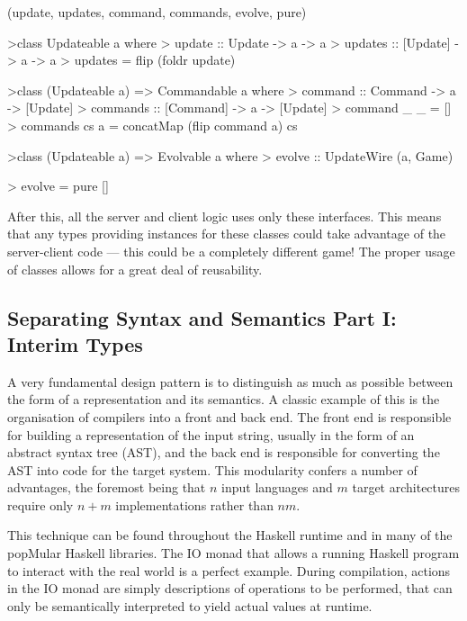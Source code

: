 \functions(update, updates, command, commands, evolve, pure)
\begin{haskell}

>class Updateable a where
>  update  ::  Update  -> a -> a
>  updates :: [Update] -> a -> a
>  updates = flip (foldr update)

>class (Updateable a) => Commandable a where
>  command  ::  Command  -> a -> [Update] 
>  commands :: [Command] -> a -> [Update]
>  command _ _ = []
>  commands cs a = concatMap (flip command a) cs

>class (Updateable a) => Evolvable a where
>  evolve :: UpdateWire (a, Game)

\vspace{-1.7em}
>  evolve = pure []

\end{haskell}
\noindent After this, all the server and client logic uses only these interfaces. This means that any types providing instances for these classes could take advantage of the server-client code --- this could be a completely different game! The proper usage of classes allows for a great deal of reusability. 

\subsection{Separating Syntax and Semantics Part I: Interim Types}

A very fundamental design pattern is to distinguish as much as possible between the form of a representation and its semantics. A classic example of this is the organisation of compilers into a front and back end. The front end is responsible for building a representation of the input string, usually in the form of an abstract syntax tree (AST), and the back end is responsible for converting the AST into code for the target system. This modularity confers a number of advantages, the foremost being that $n$ input languages and $m$ target architectures require only $n+m$ implementations rather than $nm$.

This technique can be found throughout the Haskell runtime and in many of the popMular Haskell libraries. The IO monad that allows a running Haskell program to interact with the real world is a perfect example. During compilation, actions in the IO monad are simply descriptions of operations to be performed, that can only be semantically interpreted to yield actual values at runtime.\cite{peyton1993imperative}

